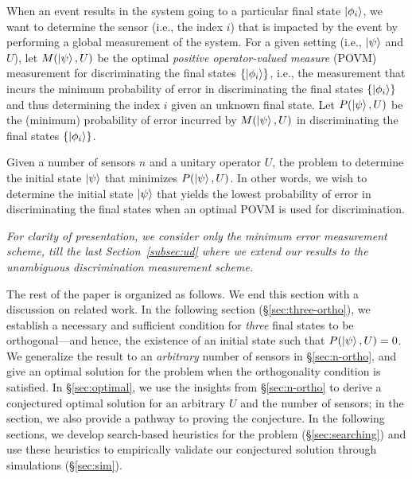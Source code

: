 When an event results in the system going to a particular final state $\ket{\phi_i}$, 
we want to determine the sensor (i.e., the index $i$) that is impacted by the event by performing a global measurement of the system. For a given setting (i.e.,  $\ket{\psi}$ and $U$), let 
$M(\ket{\psi}, U)$ be the optimal 
{\em positive operator-valued measure} (POVM) measurement for discriminating the
final states $\{\ket{\phi_i}\}$, i.e., 
the measurement that incurs the
minimum probability of error in 
discriminating the
final states $\{\ket{\phi_i}\}$ and thus
determining the index 
$i$ given an unknown final state.
Let $P(\ket{\psi}, U)$ be the (minimum) probability of error incurred by $M(\ket{\psi}, U)$ in discriminating the final states $\{\ket{\phi_i}\}$.

Given a number of sensors $n$ and a 
unitary operator $U$, 
the \iso problem to determine the 
initial state $\ket{\psi}$ that minimizes
$P(\ket{\psi}, U)$.
In other words, we wish to determine the initial state $\ket{\psi}$ 
that yields the lowest probability of error in discriminating the final states when
an optimal POVM is used for discrimination.

{\em For clarity of presentation, we consider only the minimum error measurement 
scheme, till the last Section~\ref{subsec:ud} where we extend our results to the unambiguous discrimination measurement scheme.}

The rest of the paper is organized as follows. We end this section with a discussion on related work.
In the following section (\S\ref{sec:three-ortho}), 
we establish a necessary and sufficient condition for \emph{three} final states to be orthogonal---and hence, the existence of an initial state such that 
$P(\ket{\psi}, U) = 0$. 
We generalize the result to an \emph{arbitrary} number of sensors in \S\ref{sec:n-ortho},
and give an optimal solution for the \iso problem when the orthogonality condition is satisfied.
In \S\ref{sec:optimal}, we use the insights from \S\ref{sec:n-ortho} to derive a conjectured optimal solution for an arbitrary $U$ and the number of sensors; in the section, we also provide a pathway to proving the conjecture. 
In the following sections, we develop search-based heuristics for the problem (\S\ref{sec:searching}) and use these heuristics to 
empirically validate our conjectured solution through simulations (\S\ref{sec:sim}).

